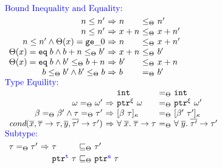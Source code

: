 \begin{DIFnomarkup}
\begin{figure}
{\small
\[\hspace*{-1.2em}
\begin{array}{l}
\textcolor{blue}{\text{Bound Inequality and Equality:}}\\[0.3em]
  \begin{array}{r@{~}c@{~}l@{~}c@{~}l}
     n \le n' &\Rightarrow& n &\le_{\Theta} & n'\\
     n \le n' &\Rightarrow& x+n &\le_{\Theta} & x+n'\\
     n \le n' \wedge \Theta(x)=\tgez &\Rightarrow& n &\le_{\Theta} & x+n'\\
     \Theta(x)=\teq{b} \wedge b+n\le_{\Theta}b'  &\Rightarrow& x+n & \le_{\Theta} & b'\\
     \Theta(x)=\teq{b}\wedge b'\le_{\Theta}b+n  &\Rightarrow& b' & \le_{\Theta} & x+n\\
     b \le_{\Theta} b' \wedge b' \le_{\Theta} b  &\Rightarrow& b & =_{\Theta} & b'
    \end{array}
  \\[1.5em]
\textcolor{blue}{\text{Type Equility:}}\\
  \begin{array}{r@{~}c@{~}l@{~}c@{~}l}
     && \tint & =_{\Theta} & \tint\\
     \omega =_{\Theta} \omega' &\Rightarrow& \tptr{\omega}{\xi} & =_{\Theta} & \tptr{\omega'}{\xi}\\
     \bvar =_{\Theta} \bvar' \wedge  \tau =_{\Theta} \tau'
             &\Rightarrow& \tallarrayb{\bvar}{\tau} & =_{\Theta} & \tallarrayb{\bvar'}{\tau'}\\

    \textit{cond}(\overline{x},\overline{\tau}\to\tau,\overline{y},\overline{\tau'}\to\tau')

 &\Rightarrow& \tfun{\overline{x}}{\overline{\tau}}{\tau} & 
                         =_{\Theta} & \tfun{\overline{y}}{\overline{\tau'}}{\tau'}\\
    \end{array}
  \\[0.7em]
\textcolor{blue}{\text{Subtype:}}\\[0.3em]

  \begin{array}{r@{~}c@{~}l@{~}c@{~}l}
    \tau =_{\Theta} \tau'&\Rightarrow&\tau &\sqsubseteq_{\Theta}& \tau'\\[0.2em]

    && \tptr{\tau}{\tmode}&\sqsubseteq_{\Theta}& \tptr{\tau}{\umode}\\[0.2em]


\end{array}
\end{array}\]}
\end{figure}
\end{DIFnomarkup}
